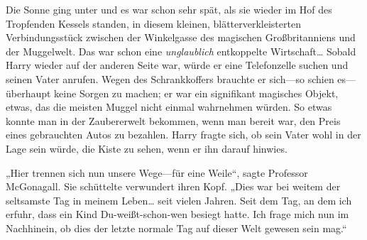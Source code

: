 Die Sonne ging unter und es war schon sehr spät, als sie wieder im Hof des Tropfenden Kessels standen, in diesem kleinen, blätterverkleisterten Verbindungsstück zwischen der Winkelgasse des magischen Großbritanniens und der Muggelwelt. Das war schon eine \emph{unglaublich} entkoppelte Wirtschaft… Sobald Harry wieder auf der anderen Seite war, würde er eine Telefonzelle suchen und seinen Vater anrufen. Wegen des Schrankkoffers brauchte er sich—so schien es—überhaupt keine Sorgen zu machen; er war ein signifikant magisches Objekt, etwas, das die meisten Muggel nicht einmal wahrnehmen würden. So etwas konnte man in der Zaubererwelt bekommen, wenn man bereit war, den Preis eines gebrauchten Autos zu bezahlen. Harry fragte sich, ob sein Vater wohl in der Lage sein würde, die Kiste zu sehen, wenn er ihn darauf hinwies.

„Hier trennen sich nun unsere Wege—für eine Weile“, sagte Professor McGonagall. Sie schüttelte verwundert ihren Kopf. „Dies war bei weitem der seltsamste Tag in meinem Leben… seit vielen Jahren. Seit dem Tag, an dem ich erfuhr, dass ein Kind Du-weißt-schon-wen besiegt hatte. Ich frage mich nun im Nachhinein, ob dies der letzte normale Tag auf dieser Welt gewesen sein mag.“

